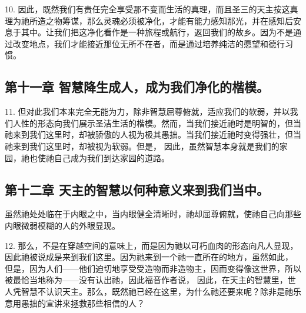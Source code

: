 10. 因此，既然我们有责任完全享受那不变而生活的真理，而且圣三的天主按这真理为祂所造之物筹谋，那么灵魂必须被净化，才能有能力感知那光，并在感知后安息于其中。让我们把这净化看作是一种旅程或航行，返回我们的故乡。因为不是通过改变地点，我们才能接近那位无所不在者，而是通过培养纯洁的愿望和德行习惯。\par


\subsection{第十一章 智慧降生成人，成为我们净化的楷模。}

11. 但对此我们本来完全无能为力，除非智慧屈尊俯就，适应我们的软弱，并以我们人性的形态向我们展示圣洁生活的楷模。然而，当我们接近祂时是明智的，但当祂来到我们这里时，却被骄傲的人视为极其愚拙。当我们接近祂时变得强壮，但当祂来到我们这里时，却被视为软弱。但是，  因此，虽然智慧本身就是我们的家园，祂也使祂自己成为我们到达家园的道路。\par


\subsection{第十二章 天主的智慧以何种意义来到我们当中。}

虽然祂处处临在于内眼之中，当内眼健全清晰时，祂却屈尊俯就，使祂自己向那些内眼微弱模糊的人的外眼显现。 \par

12. 那么，不是在穿越空间的意味上，而是因为祂以可朽血肉的形态向凡人显现，因此祂被说成是来到我们这里。因为祂来到一个祂一直所在的地方，虽然如此， 但是，因为人们——他们迫切地享受受造物而非造物主，因而变得像这世界，所以被最恰当地称为——没有认出祂，因此福音作者说，  因此，在天主的智慧里，世人凭智慧不认识天主。那么，既然祂已经在这里，为什么祂还要来呢？除非是祂乐意用愚拙的宣讲来拯救那些相信的人？\par


